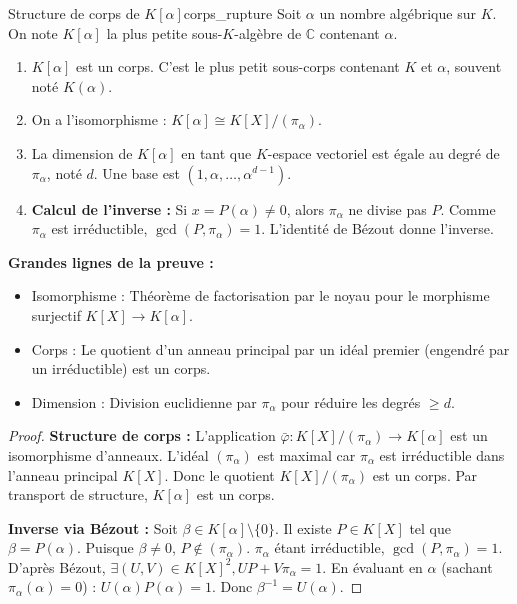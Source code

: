 \documentclass{prepacours}
\begin{document}
\begin{proposition}{Structure de corps de $K[\alpha]$}{corps_rupture}
    Soit $\alpha$ un nombre algébrique sur $K$. On note $K[\alpha]$ la plus petite sous-$K$-algèbre de $\mathbb{C}$ contenant $\alpha$.
    \begin{enumerate}
        \item $K[\alpha]$ est un corps. C'est le plus petit sous-corps contenant $K$ et $\alpha$, souvent noté $K(\alpha)$.
        \item On a l'isomorphisme : $K[\alpha] \cong K[X] / (\pi_\alpha)$.
        \item La dimension de $K[\alpha]$ en tant que $K$-espace vectoriel est égale au degré de $\pi_\alpha$, noté $d$. Une base est $(1, \alpha, \dots, \alpha^{d-1})$.
        \item \textbf{Calcul de l'inverse :} Si $x = P(\alpha) \neq 0$, alors $\pi_\alpha$ ne divise pas $P$. Comme $\pi_\alpha$ est irréductible, $\gcd(P, \pi_\alpha) = 1$. L'identité de Bézout donne l'inverse.
    \end{enumerate}
\end{proposition}

\noindent \textbf{Grandes lignes de la preuve :}
\begin{itemize}
    \item Isomorphisme : Théorème de factorisation par le noyau pour le morphisme surjectif $K[X] \to K[\alpha]$.
    \item Corps : Le quotient d'un anneau principal par un idéal premier (engendré par un irréductible) est un corps.
    \item Dimension : Division euclidienne par $\pi_\alpha$ pour réduire les degrés $\ge d$.
\end{itemize}

\begin{proof}
    \textbf{Structure de corps :}
    L'application $\bar{\varphi} : K[X]/(\pi_\alpha) \to K[\alpha]$ est un isomorphisme d'anneaux.
    L'idéal $(\pi_\alpha)$ est maximal car $\pi_\alpha$ est irréductible dans l'anneau principal $K[X]$.
    Donc le quotient $K[X]/(\pi_\alpha)$ est un corps. Par transport de structure, $K[\alpha]$ est un corps.

    \textbf{Inverse via Bézout :}
    Soit $\beta \in K[\alpha] \setminus \{0\}$. Il existe $P \in K[X]$ tel que $\beta = P(\alpha)$.
    Puisque $\beta \neq 0$, $P \notin (\pi_\alpha)$.
    $\pi_\alpha$ étant irréductible, $\gcd(P, \pi_\alpha) = 1$.
    D'après Bézout, $\exists (U, V) \in K[X]^2, U P + V \pi_\alpha = 1$.
    En évaluant en $\alpha$ (sachant $\pi_\alpha(\alpha)=0$) : $U(\alpha) P(\alpha) = 1$.
    Donc $\beta^{-1} = U(\alpha)$.
\end{proof}
\end{document}
